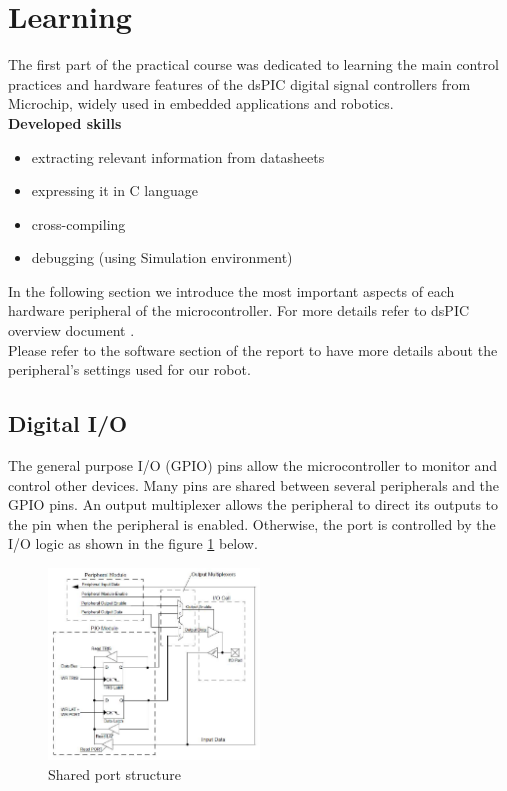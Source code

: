 \section{Learning}
\noindent
The first part of the practical course was dedicated to learning the main control practices and hardware features of the dsPIC digital signal controllers from Microchip, widely used in embedded applications and robotics.\\

\noindent
\textbf{Developed skills}
\begin{itemize}
    \item extracting relevant information from datasheets
    \item expressing it in C language
    \item cross-compiling
    \item debugging (using Simulation environment)
\end{itemize}

\noindent
In the following section we introduce the most important aspects of each hardware peripheral of the microcontroller. For more details refer to dsPIC overview document \cite{alex}.\\
Please refer to the software section of the report to have more details about the peripheral’s settings used for our robot.

\subsection{Digital I/O}

The general purpose I/O (GPIO) pins allow the microcontroller to monitor and control other devices. Many pins are shared between several peripherals and the GPIO pins. An output multiplexer allows the peripheral to direct its outputs to the pin when the peripheral is enabled. Otherwise, the port is controlled by the I/O logic as shown in the figure \ref{fig:gpio} below.\\

\begin{figure}[H]
    \centering
    \includegraphics[width=0.5\textwidth]{figures/software/GPIO.PNG}
    \caption{Shared port structure \cite{alex}}
    \label{fig:gpio}
\end{figure}

